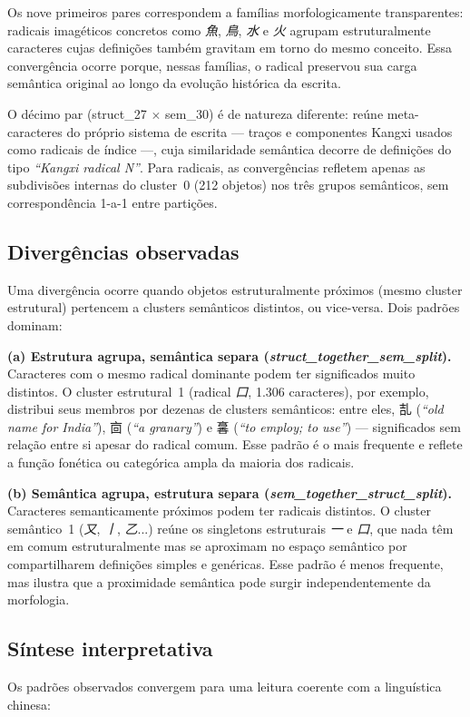 \documentclass[10pt, a4paper, titlepage]{extarticle}
\begin{document}
Os nove primeiros pares correspondem a famílias morfologicamente
transparentes: radicais imagéticos concretos como \textit{魚}, \textit{鳥},
\textit{水} e \textit{火} agrupam estruturalmente caracteres cujas definições
também gravitam em torno do mesmo conceito. Essa convergência ocorre porque,
nessas famílias, o radical preservou sua carga semântica original ao longo
da evolução histórica da escrita.

O décimo par (struct\_27 $\times$ sem\_30) é de natureza diferente: reúne
meta-caracteres do próprio sistema de escrita --- traços e
componentes Kangxi usados como radicais de índice ---, cuja similaridade
semântica decorre de definições do tipo \textit{``Kangxi radical N''}.
Para radicais, as convergências refletem apenas as subdivisões internas do
cluster~0 (212 objetos) nos três grupos semânticos, sem correspondência
1-a-1 entre partições.

\subsection{Divergências observadas}
Uma divergência ocorre quando objetos estruturalmente próximos
(mesmo cluster estrutural) pertencem a clusters semânticos distintos, ou
vice-versa. Dois padrões dominam:

\textbf{(a) Estrutura agrupa, semântica separa
(\emph{struct\_together\_sem\_split}).}
Caracteres com o mesmo radical dominante podem ter significados muito
distintos. O cluster estrutural~1 (radical \textit{口}, 1.306 caracteres),
por exemplo, distribui seus membros por dezenas de clusters semânticos:
entre eles, 㐖 (\textit{``old name for India''}), 㐭 (\textit{``a granary''})
e 㐯 (\textit{``to employ; to use''}) --- significados sem relação entre si
apesar do radical comum. Esse padrão é o mais frequente e reflete a função
fonética ou categórica ampla da maioria dos radicais.

\textbf{(b) Semântica agrupa, estrutura separa
(\emph{sem\_together\_struct\_split}).}
Caracteres semanticamente próximos podem ter radicais distintos. O cluster
semântico~1 (\textit{又}, \textit{丨}, \textit{乙}...) reúne os singletons
estruturais \textit{一} e \textit{口}, que nada têm em comum
estruturalmente mas se aproximam no espaço semântico por compartilharem
definições simples e genéricas. Esse padrão é menos frequente, mas ilustra que a proximidade semântica pode surgir independentemente da morfologia.

\subsection{Síntese interpretativa}
Os padrões observados convergem para uma leitura coerente com a
linguística chinesa:
\end{document}
